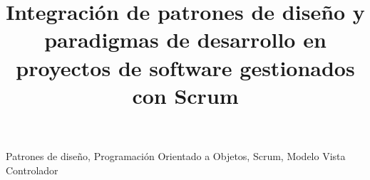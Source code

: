 \documentclass[conference]{IEEEtran}
\begin{document}
\title{Integración de patrones de diseño y paradigmas de desarrollo en proyectos de software gestionados con Scrum}

\author{
}

\maketitle

\begin{abstract}

\end{abstract}

\begin{IEEEkeywords}
Patrones de diseño, Programación Orientado a Objetos, Scrum, Modelo Vista Controlador
\end{IEEEkeywords}










\printbibliography
\end{document}
